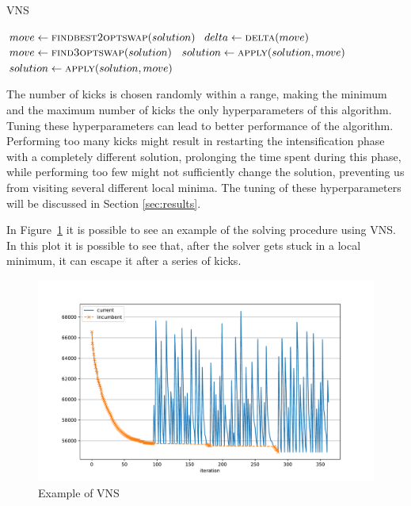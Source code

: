 \documentclass{article}
\begin{document}
\begin{algorithm}[ht]
\caption{VNS}
\label{alg:vns}
\begin{algorithmic}
        \State{}
                \State $move \gets \Call{findbest2optswap}{solution}$
                \State $delta \gets \Call{delta}{move}$
                                \State $move \gets \Call{find3optswap}{solution}$
                                \State $solution \gets \Call{apply}{solution, move}$
                        \EndFor
                \Else
                        \State $solution \gets \Call{apply}{solution, move}$
                \EndIf
        \EndWhile
\EndProcedure
\end{algorithmic}
\end{algorithm}

The number of kicks is chosen randomly within a range, making the minimum and the maximum number
of kicks the only hyperparameters of this algorithm.
Tuning these hyperparameters can lead to better performance of the algorithm. Performing too many
kicks might result in restarting the intensification phase with a completely different solution,
prolonging the time spent during this phase, while performing
too few might not sufficiently change the solution, preventing us from visiting several different local minima.
The tuning of these hyperparameters will be discussed in Section \ref{sec:results}.

In Figure~\ref{fig:vns} it is possible to see an example of the solving procedure
using VNS. In this plot it is possible to see that, after the solver gets
stuck in a local minimum, it can escape it after a series of kicks.

\begin{figure}[ht]
        \caption{Example of VNS}
        \label{fig:vns}
        \centering
        \includegraphics[width=400pt]{assets/vns.pdf}
\end{figure}
\end{document}
